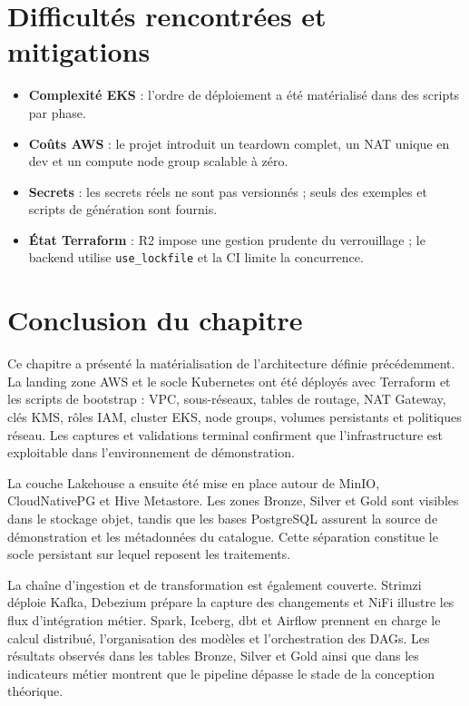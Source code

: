 \section{Difficultés rencontrées et mitigations}

\begin{itemize}
    \item \textbf{Complexité EKS} : l'ordre de déploiement a été matérialisé dans des scripts par phase.
    \item \textbf{Coûts AWS} : le projet introduit un teardown complet, un NAT unique en dev et un compute node group scalable à zéro.
    \item \textbf{Secrets} : les secrets réels ne sont pas versionnés ; seuls des exemples et scripts de génération sont fournis.
    \item \textbf{État Terraform} : R2 impose une gestion prudente du verrouillage ; le backend utilise \texttt{use\_lockfile} et la CI limite la concurrence.
\end{itemize}

\FloatBarrier

\section*{Conclusion du chapitre}

Ce chapitre a présenté la matérialisation de l'architecture définie précédemment. La landing zone AWS et le socle Kubernetes ont été déployés avec Terraform et les scripts de bootstrap : VPC, sous-réseaux, tables de routage, NAT Gateway, clés KMS, rôles IAM, cluster EKS, node groups, volumes persistants et politiques réseau. Les captures et validations terminal confirment que l'infrastructure est exploitable dans l'environnement de démonstration.

La couche Lakehouse a ensuite été mise en place autour de MinIO, CloudNativePG et Hive Metastore. Les zones Bronze, Silver et Gold sont visibles dans le stockage objet, tandis que les bases PostgreSQL assurent la source de démonstration et les métadonnées du catalogue. Cette séparation constitue le socle persistant sur lequel reposent les traitements.

La chaîne d'ingestion et de transformation est également couverte. Strimzi déploie Kafka, Debezium prépare la capture des changements et NiFi illustre les flux d'intégration métier. Spark, Iceberg, dbt et Airflow prennent en charge le calcul distribué, l'organisation des modèles et l'orchestration des DAGs. Les résultats observés dans les tables Bronze, Silver et Gold ainsi que dans les indicateurs métier montrent que le pipeline dépasse le stade de la conception théorique.

